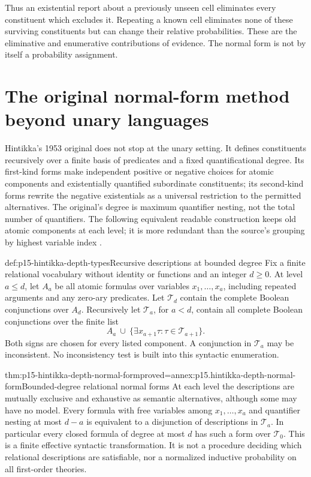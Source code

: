 Thus an existential report about a previously unseen cell eliminates
every constituent which excludes it. Repeating a known cell eliminates
none of these surviving constituents but can change their relative
probabilities. These are the eliminative and enumerative contributions
of evidence. The normal form is not by itself a probability assignment.

\section{The original normal-form method beyond unary languages}
\label{sec:p15-hintikka-original-normal-forms}

Hintikka's 1953 original does not stop at the unary setting. It defines
constituents recursively over a finite basis of predicates and a fixed
quantificational degree. Its first-kind forms make independent positive
or negative choices for atomic components and existentially quantified
subordinate constituents; its second-kind forms rewrite the negative
existentials as a universal restriction to the permitted alternatives.
The original's degree is maximum quantifier nesting, not the total
number of quantifiers. The following equivalent readable construction
keeps old atomic components at each level; it is more redundant than
the source's grouping by highest variable index
\cite[sec.~3, subsecs.~17--21, pp.~31--39]{Hintikka1953DistributiveNormalForms}.

\begin{hbdefinition}{def:p15-hintikka-depth-types}{Recursive descriptions at bounded degree}
Fix a finite relational vocabulary without identity or functions and
an integer \(d\geq0\). At level \(a\leq d\), let \(A_a\)
be all atomic formulas over variables \(x_1,\ldots,x_a\), including
repeated arguments and any zero-ary predicates. Let \(\mathcal T_d\)
contain the complete Boolean conjunctions over \(A_d\).
Recursively let \(\mathcal T_a\), for \(a<d\), contain all
complete Boolean conjunctions over the finite list
\[
 A_a\ \cup\ \{\exists x_{a+1}\tau:
                  \tau\in\mathcal T_{a+1}\}.
\]
Both signs are chosen for every listed component. A conjunction in
\(\mathcal T_a\) may be inconsistent. No inconsistency test is
built into this syntactic enumeration.
\end{hbdefinition}

\begin{hbtheorem}{thm:p15-hintikka-depth-normal-form}{proved=annex:p15.hintikka-depth-normal-form}{Bounded-degree relational normal forms}
At each level the descriptions are mutually exclusive and exhaustive
as semantic alternatives, although some may have no model. Every formula
with free variables among \(x_1,\ldots,x_a\) and quantifier nesting
at most \(d-a\) is equivalent to a disjunction of descriptions in
\(\mathcal T_a\). In particular every closed formula of degree at
most \(d\) has such a form over \(\mathcal T_0\).
This is a finite effective syntactic transformation. It is not a
procedure deciding which relational descriptions are satisfiable, nor
a normalized inductive probability on all first-order theories.
\end{hbtheorem}

